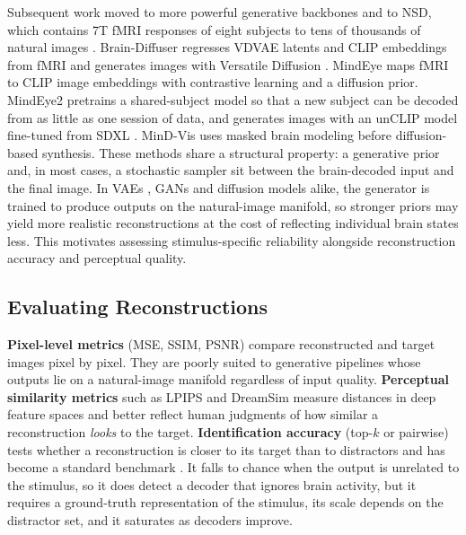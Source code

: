 \documentclass[11pt,a4paper]{article}
\begin{document}
Subsequent work moved to more powerful generative backbones and to NSD, which
contains 7T fMRI responses of eight subjects to tens of thousands of natural
images \citep{allen2022}. Brain-Diffuser \citep{ozcelik2023} regresses VDVAE
latents \citep{child2021} and CLIP embeddings \citep{radford2021} from fMRI and
generates images with Versatile Diffusion \citep{xu2023vd}. MindEye
\citep{scotti2023} maps fMRI to CLIP image embeddings with contrastive learning
and a diffusion prior. MindEye2 \citep{scotti2024} pretrains a shared-subject
model so that a new subject can be decoded from as little as one session of
data, and generates images with an unCLIP model fine-tuned from SDXL
\citep{podell2024}. MinD-Vis \citep{chen2023} uses masked brain modeling before
diffusion-based synthesis. These methods share a structural property: a
generative prior and, in most cases, a stochastic sampler sit between the
brain-decoded input and the final image. In VAEs \citep{kingma2014}, GANs
\citep{goodfellow2014} and diffusion models \citep{ho2020,song2021} alike, the
generator is trained to produce outputs on the natural-image manifold, so
stronger priors may yield more realistic reconstructions at the cost of
reflecting individual brain states less. This motivates assessing
stimulus-specific reliability alongside reconstruction accuracy and perceptual
quality.

\subsection{Evaluating Reconstructions}

\textbf{Pixel-level metrics} (MSE, SSIM, PSNR) compare reconstructed and target
images pixel by pixel. They are poorly suited to generative pipelines whose
outputs lie on a natural-image manifold regardless of input quality.
\textbf{Perceptual similarity metrics} such as LPIPS \citep{zhang2018} and
DreamSim \citep{fu2023} measure distances in deep feature spaces and better
reflect human judgments of how similar a reconstruction \textit{looks} to the
target. \textbf{Identification accuracy} (top-$k$ or pairwise) tests whether a
reconstruction is closer to its target than to distractors and has become a
standard benchmark \citep{shen2019,scotti2023}. It falls to chance when the
output is unrelated to the stimulus, so it does detect a decoder that ignores
brain activity, but it requires a ground-truth representation of the stimulus,
its scale depends on the distractor set, and it saturates as decoders improve.
\end{document}
